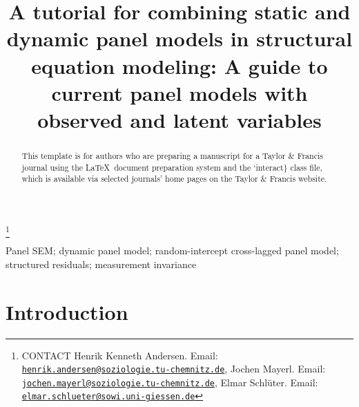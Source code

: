 \documentclass[]{interact}
\theoremstyle{plain}%
\theoremstyle{definition}
\theoremstyle{remark}
\begin{document}

\title{A tutorial for combining static and dynamic panel models in
structural equation modeling: A guide to current panel models with
observed and latent variables}


\author{
}

\thanks{CONTACT Henrik Kenneth
Andersen. Email: \href{mailto:henrik.andersen@soziologie.tu-chemnitz.de}{\nolinkurl{henrik.andersen@soziologie.tu-chemnitz.de}}, Jochen
Mayerl. Email: \href{mailto:jochen.mayerl@soziologie.tu-chemnitz.de}{\nolinkurl{jochen.mayerl@soziologie.tu-chemnitz.de}}, Elmar
Schlüter. Email: \href{mailto:elmar.schlueter@sowi.uni-giessen.de}{\nolinkurl{elmar.schlueter@sowi.uni-giessen.de}}}

\maketitle

\begin{abstract}
This template is for authors who are preparing a manuscript for a Taylor
\& Francis journal using the \LaTeX~document preparation system and the
`interact\} class file, which is available via selected journals' home
pages on the Taylor \& Francis website.
\end{abstract}

\begin{keywords}
Panel SEM; dynamic panel model; random-intercept cross-lagged panel
model; structured residuals; measurement invariance
\end{keywords}

\hypertarget{introduction}{%
\section{Introduction}\label{introduction}}
\end{document}
